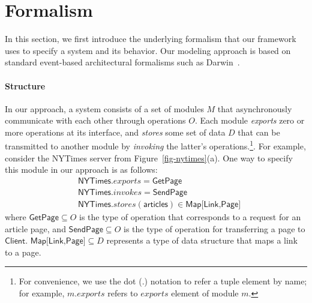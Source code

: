 
\section{Formalism}
\label{sec-formalism}

In this section, we first introduce the underlying formalism that our
framework uses to specify a system and its behavior. Our modeling
approach is based on standard event-based architectural formalisms
such as Darwin~\cite{darwin}.

\paragraph{\textbf{Structure}} In our approach, a system consists of a set of
modules $M$ that asynchronously communicate with each other through
operations $O$.  Each module \textit{exports} zero or more operations
at its interface, and \textit{stores} some set of data $D$ that can be
transmitted to another module by \textit{invoking} the latter's
operations.\footnote{For convenience, we use the dot (.) notation to refer
  a tuple element by name; for example, $m.exports$ refers to $exports$
  element of module $m$.}. For example, consider the \textsf{NYTimes} server from
Figure~\ref{fig-nytimes}(a). One way to specify this module in our
approach is as follows:
\begin{align*}
&\textsf{NYTimes}.exports = \textsf{GetPage}\\
&\textsf{NYTimes}.invokes = \textsf{SendPage}\\
&\textsf{NYTimes}.stores(\textsf{articles}) \in
\textsf{Map[Link,Page]}
\end{align*}
where $\textsf{GetPage} \subseteq O$ is the type of operation that
corresponds to a request for an article page, and $\textsf{SendPage}
\subseteq O$ is the type of operation for transferring a page to
$\textsf{Client}$. $\textsf{Map[Link,Page]} \subseteq D$ represents a
type of data structure that maps a link to a page.

